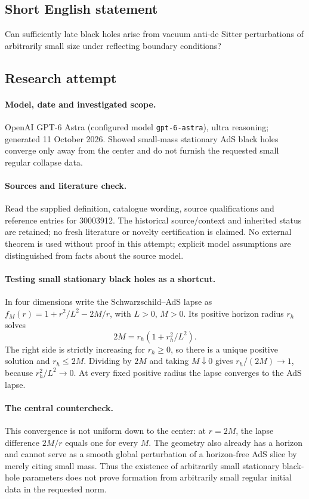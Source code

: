 \documentclass[11pt]{article}
\begin{document}
\subsection{Short English statement}
Can sufficiently late black holes arise from vacuum anti-de Sitter perturbations of arbitrarily small size under reflecting boundary conditions?
\subsection{Research attempt}
\paragraph{Model, date and investigated scope.}
OpenAI GPT-6 Astra (configured model \texttt{gpt-6-astra}), ultra reasoning; generated 11 October 2026. Showed small-mass stationary AdS black holes converge only away from the center and do not furnish the requested small regular collapse data.

\paragraph{Sources and literature check.}
Read the supplied definition, catalogue wording, source qualifications and reference entries for 30003912. The historical source/context and inherited status are retained; no fresh literature or novelty certification is claimed. No external theorem is used without proof in this attempt; explicit model assumptions are distinguished from facts about the source model.

\paragraph{Testing small stationary black holes as a shortcut.} In four dimensions write the Schwarzschild--AdS lapse as \(f_M(r)=1+r^2/L^2-2M/r\), with \(L>0\), \(M>0\). Its positive horizon radius \(r_h\) solves
\[
 2M=r_h(1+r_h^2/L^2).
\]
The right side is strictly increasing for \(r_h\ge0\), so there is a unique positive solution and \(r_h\le2M\). Dividing by \(2M\) and taking \(M\downarrow0\) gives \(r_h/(2M)\to1\), because \(r_h^2/L^2\to0\). At every fixed positive radius the lapse converges to the AdS lapse.
\paragraph{The central countercheck.} This convergence is not uniform down to the center: at \(r=2M\), the lapse difference \(2M/r\) equals one for every \(M\). The geometry also already has a horizon and cannot serve as a smooth global perturbation of a horizon-free AdS slice by merely citing small mass. Thus the existence of arbitrarily small stationary black-hole parameters does not prove formation from arbitrarily small regular initial data in the requested norm.
\end{document}
